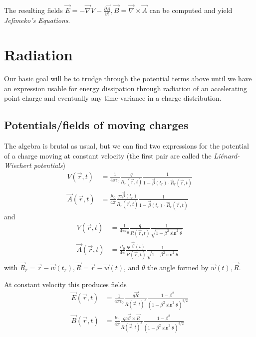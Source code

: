 \documentclass[10pt,twocolumn]{article}
\newcommand{\pd}[2]{\frac{\partial#1}{\partial#2}}
\begin{document}
The resulting fields $\vec{E} = -\vec{\nabla}V - \pd{\vec{A}}{t}, \vec{B} = \vec{\nabla} \times \vec{A}$ can be computed and yield \emph{Jefimeko's Equations}.

\section{Radiation}

Our basic goal will be to trudge through the potential terms above until we have an expression usable for energy dissipation through radiation of an accelerating point charge and eventually any time-variance in a charge distribution.

\subsection{Potentials/fields of moving charges}

The algebra is brutal as usual, but we can find two expressions for the potential of a charge moving at constant velocity (the first pair are called the \emph{Li\'enard-Wiechert potentials})
\begin{align}
    V(\vec{r},t) &= \frac{1}{4\pi\epsilon_0}\frac{q}{R_r(\vec{r},t)}\frac{1}{1 - \vec{\beta}(t_r) \cdot \hat{R}_r(\vec{r},t)}\\
    \vec{A}(\vec{r},t) &= \frac{\mu_0}{4\pi}\frac{qc\vec{\beta}(t_r)}{R_r(\vec{r},t)}\frac{1}{1 - \vec{\beta}(t_r) \cdot \hat{R}_r(\vec{r},t)}\label{LW}
\end{align}
and
\begin{align}
    V(\vec{r},t) &= \frac{1}{4\pi\epsilon_0}\frac{q}{R(\vec{r},t)}\frac{1}{\sqrt{1 - \beta^2 \sin^2\theta}}\\
    \vec{A}(\vec{r},t) &= \frac{\mu_0}{4\pi}\frac{qc\vec{\beta}(t)}{R(\vec{r},t)}\frac{1}{\sqrt{1 - \beta^2 \sin^2\theta}}
\end{align}
with $\vec{R}_r = \vec{r} - \vec{w}(t_r), \vec{R} = \vec{r} - \vec{w}(t)$, and $\theta$ the angle formed by $\vec{w}(t), \vec{R}$.

At constant velocity this produces fields
\begin{align}
    \vec{E}(\vec{r},t) &= \frac{1}{4\pi\epsilon_0}\frac{q\vec{R}}{R(\vec{r},t)^3}\frac{1 - \beta^2}{\left(1 - \beta^2 \sin^2\theta\right)^{3/2}}\\
    \vec{B}(\vec{r},t) &= \frac{\mu_0}{4\pi}\frac{qc\vec{\beta}\times \vec{R}}{R(\vec{r},t)^3}\frac{1-\beta^2}{\left(1 - \beta^2 \sin^2\theta\right)^{3/2}}
\end{align}
\end{document}
